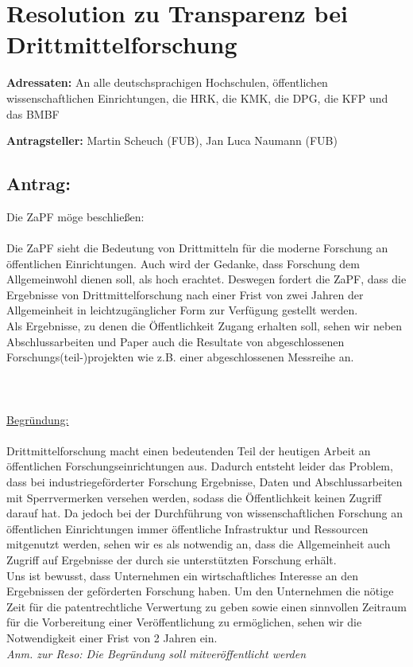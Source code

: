 \documentclass[DIV=9]{scrartcl}
\begin{document}
\section*{Resolution zu Transparenz bei Drittmittelforschung}

\textbf{Adressaten:} An alle deutschsprachigen Hochschulen, öffentlichen wissenschaftlichen Einrichtungen, die HRK, die KMK, die DPG, die KFP und das BMBF

\textbf{Antragsteller:} Martin Scheuch (FUB), Jan Luca Naumann (FUB)

\subsection*{Antrag:}
Die ZaPF möge beschließen:\\\\

Die ZaPF sieht die Bedeutung von Drittmitteln für die moderne Forschung an öffentlichen Einrichtungen. Auch wird der Gedanke, dass Forschung dem Allgemeinwohl dienen soll, als hoch erachtet. Deswegen fordert die ZaPF, dass die Ergebnisse von Drittmittelforschung nach einer Frist von zwei Jahren der Allgemeinheit in leichtzugänglicher Form zur Verfügung gestellt werden.\\

Als Ergebnisse, zu denen die Öffentlichkeit Zugang erhalten soll, sehen wir neben Abschlussarbeiten und Paper auch die Resultate von abgeschlossenen Forschungs(teil-)projekten wie z.B. einer abgeschlossenen Messreihe an.
~\\\\\\\\
\underline{Begründung:}\\\\
Drittmittelforschung macht einen bedeutenden Teil der heutigen Arbeit an öffentlichen Forschungseinrichtungen aus. Dadurch entsteht leider das Problem, dass bei industriegeförderter Forschung Ergebnisse, Daten und Abschlussarbeiten mit Sperrvermerken versehen werden, sodass die Öffentlichkeit keinen Zugriff darauf hat. Da jedoch bei der Durchführung von wissenschaftlichen Forschung an öffentlichen Einrichtungen immer öffentliche Infrastruktur und Ressourcen mitgenutzt werden, sehen wir es als notwendig an, dass die Allgemeinheit auch Zugriff auf Ergebnisse der durch sie unterstützten Forschung erhält.\\
Uns ist bewusst, dass Unternehmen ein wirtschaftliches Interesse an den Ergebnissen der geförderten Forschung haben. Um den Unternehmen die nötige Zeit für die patentrechtliche Verwertung zu geben sowie einen sinnvollen Zeitraum für die Vorbereitung einer Veröffentlichung zu ermöglichen, sehen wir die Notwendigkeit einer Frist von 2 Jahren ein.\\

\emph{Anm. zur Reso: Die Begründung soll mitveröffentlicht werden}
\end{document}
